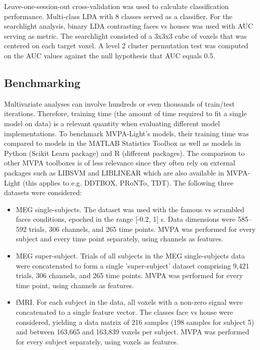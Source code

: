 \documentclass[utf8]{frontiersSCNS} %
\begin{document}
 Leave-one-session-out cross-validation was used to calculate classification performance. Multi-class LDA with 8 classes served as a classifier. For the searchlight analysis, binary LDA contrasting faces vs houses was used with AUC serving as metric. The searchlight consisted of a 3x3x3 cube of voxels that was centered on each target voxel. A level 2 cluster permutation test was computed on the AUC values against the null hypothesis that AUC equals 0.5.

\subsection{Benchmarking}

Multivariate analyses can involve hundreds or even thousands of train/test iterations. Therefore,  training time (the amount of time required to fit a single model on data) is a relevant quantity when evaluating different model implementations. To benchmark MVPA-Light's models, their training time was compared to models in the MATLAB Statistics Toolbox as well as models in Python (Scikit Learn package) and R (different packages). The comparison to other MVPA toolboxes is of less relevance since they often rely on external packages such as LIBSVM and LIBLINEAR which are also available in MVPA-Light (this applies to e.g. DDTBOX, PRoNTo, TDT). The following three datasets were considered:


\begin{itemize}
    \item MEG single-subjects. The \cite{Wakeman2015ADataset} dataset was used with the famous vs scrambled faces conditions, epoched in the range [-0.2, 1] s. Data dimensions were 585--592 trials, 306 channels, and 265 time points. MVPA was performed for every subject and every time point separately, using channels as features.
    \item MEG super-subject. Trials of all subjects in the MEG single-subjects data were concatenated to form a single 'super-subject' dataset comprising 9,421 trials, 306 channels, and 265 time points. MVPA was performed for every time point, using channels as features.
    \item fMRI. For each subject in the \cite{Haxby2001} data, all voxels with a non-zero signal were concatenated to a single feature vector. The classes face vs house were considered, yielding a data matrix of 216 samples (198 samples for subject 5) and between 163,665 and 163,839 voxels per subject. MVPA was performed for every subject separately, using voxels as features.
\end{itemize}
\end{document}
